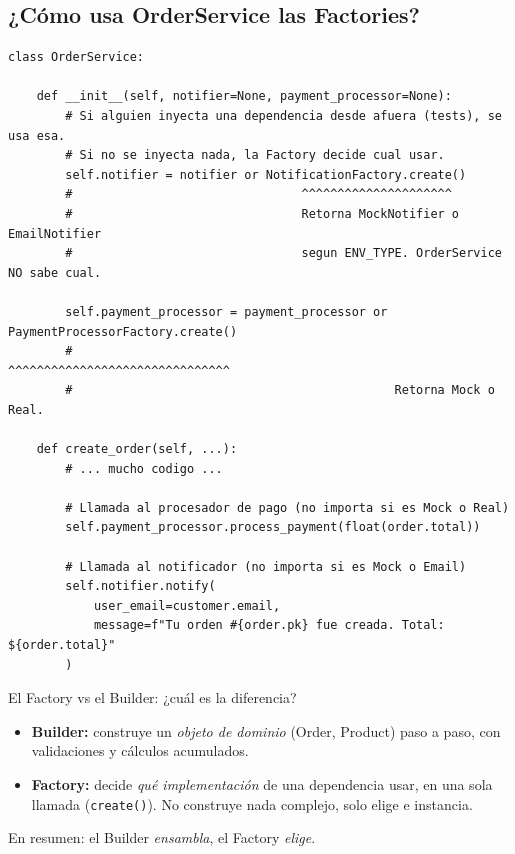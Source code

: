\documentclass[12pt, a4paper]{article}
\begin{document}
\subsection{¿Cómo usa OrderService las Factories?}

\begin{lstlisting}[caption={orders/services.py -- OrderService usa las Factories}]
class OrderService:

    def __init__(self, notifier=None, payment_processor=None):
        # Si alguien inyecta una dependencia desde afuera (tests), se usa esa.
        # Si no se inyecta nada, la Factory decide cual usar.
        self.notifier = notifier or NotificationFactory.create()
        #                                ^^^^^^^^^^^^^^^^^^^^^
        #                                Retorna MockNotifier o EmailNotifier
        #                                segun ENV_TYPE. OrderService NO sabe cual.

        self.payment_processor = payment_processor or PaymentProcessorFactory.create()
        #                                             ^^^^^^^^^^^^^^^^^^^^^^^^^^^^^^^
        #                                             Retorna Mock o Real.

    def create_order(self, ...):
        # ... mucho codigo ...

        # Llamada al procesador de pago (no importa si es Mock o Real)
        self.payment_processor.process_payment(float(order.total))

        # Llamada al notificador (no importa si es Mock o Email)
        self.notifier.notify(
            user_email=customer.email,
            message=f"Tu orden #{order.pk} fue creada. Total: ${order.total}"
        )
\end{lstlisting}

\begin{warnbox}{El Factory vs el Builder: ¿cuál es la diferencia?}
\begin{itemize}[noitemsep]
  \item \textbf{Builder:} construye un \textit{objeto de dominio} (Order, Product) paso a paso, con validaciones y cálculos acumulados.
  \item \textbf{Factory:} decide \textit{qué implementación} de una dependencia usar, en una sola llamada (\texttt{create()}). No construye nada complejo, solo elige e instancia.
\end{itemize}
En resumen: el Builder \textit{ensambla}, el Factory \textit{elige}.
\end{warnbox}
\end{document}
